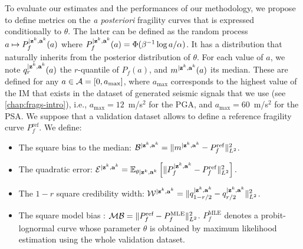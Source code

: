To evaluate our estimates and the performances of our methodology, we propose to define metrics on the \emph{a posteriori} fragility curves that is expressed conditionally to $\theta$.
The latter can be defined as the
random process $a\mapsto P_f^{|\mathbf{z}^k,\mathbf{a}^k}(a)$ where  $P_f^{|\mathbf{z}^k,\mathbf{a}^k}(a)=\Phi(\beta^{-1}\log a/\alpha)$\vspace*{-4pt}. It has a distribution that naturally inherits from the posterior distribution of $\theta$.
For each value of $a$, we note $q_r^{|\mathbf{z}^k,\mathbf{a}^k}(a)$ the $r$-quantile of $P_f(a)$, and $m^{|\mathbf{z}^k,\mathbf{a}^k}(a)$ its median.
These are defined for any $a\in\mathcal{A}=[0,a_{\text{max}}]$, where $a_{\text{max}}$ corresponds to the highest value of the IM that exists in the dataset of generated seismic signals that we use (see \cref{chap:frags-intro}), i.e.,
$a_{\text{max}}=12$~m/s$^2$ for the PGA, and  $a_{\text{max}}=60$~m/s$^2$ for the PSA.
We suppose that a validation dataset allows to define a reference fragility curve $P_f^{\text{ref}}$. We define:
\begin{itemize}
    \item The square bias to the median: $\mathcal{B}^{|\mathbf{z}^k,\mathbf{a}^k} = \|m^{|\mathbf{z}^k,\mathbf{a}^k}- P_f^{\mathrm{ref}}\|^2_{L^2}$. %
    \item The quadratic error: $\mathcal{E}^{|\mathbf{z}^k,\mathbf{a}^k}=\mathbb{E}_{\theta|\mathbf{z}^k,\mathbf{a}^k}\left[\|P_f^{|\mathbf{z}^k,\mathbf{a}^k}-P_f^{\mathrm{ref}} \|^2_{L^2}\right].$
    \item The $1-r$ square credibility width: $\mathcal{W}^{|\mathbf{z}^k,\mathbf{a}^k}= \|q_{1-{r/2}}^{|\mathbf{z}^k,\mathbf{a}^k} - q_{{r/2}}^{|\mathbf{z}^k,\mathbf{a}^k}\|_{L^2}^2$.
    \item {The square model bias :  $\mathcal{M}\mathcal{B} = \|P_f^{\text{ref}}-P_f^{\text{MLE}}\|_{L^2}^2$. $P_f^{\text{MLE}}$ denotes a probit-lognormal curve whose parameter $\theta$ is obtained by maximum likelihood estimation using the whole validation dataset.}
\end{itemize}


